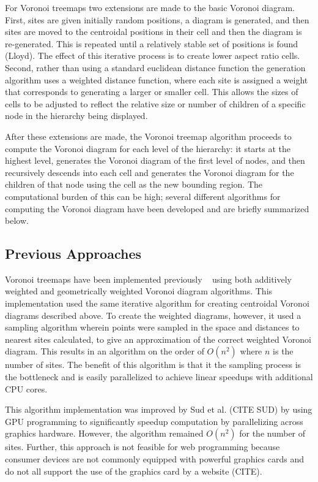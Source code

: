 \documentclass{acm_proc_article-sp}
\begin{document}
For Voronoi treemaps two extensions are made to the basic Voronoi
diagram. First, sites are given initially random positions, a diagram
is generated, and then sites are moved to the centroidal positions in
their cell and then the diagram is re-generated. This is repeated
until a relatively stable set of positions is found (Lloyd). The effect of
this iterative process is to create lower aspect ratio cells. Second,
rather than using a standard euclidean distance function the
generation algorithm uses a weighted distance function, where each
site is assigned a weight that corresponds to generating a larger or
smaller cell. This allows the sizes of cells to be adjusted to reflect
the relative size or number of children of a specific node in the
hierarchy being displayed. 

After these extensions are made, the Voronoi treemap algorithm
proceeds to compute the Voronoi diagram for each level of the
hierarchy: it starts at the highest level, generates the Voronoi
diagram of the first level of nodes, and then recursively descends
into each cell and generates the Voronoi diagram for the children of
that node using the cell as the new bounding region. The computational
burden of this can be high; several different algorithms for computing
the Voronoi diagram have been developed and are briefly summarized
below.

\subsection{Previous Approaches}
Voronoi treemaps have been implemented previously ~\cite{balzer:treemaps} using both
additively weighted and geometrically weighted Voronoi diagram
algorithms. This implementation used the same iterative algorithm for
creating centroidal Voronoi diagrams described above. To create the
weighted diagrams, however, it used a sampling algorithm wherein
points were sampled in the space and distances to nearest sites
calculated, to give an approximation of the correct weighted Voronoi
diagram. This results in an algorithm on the order of $O(n^2)$ where
$n$ is the number of sites. The benefit of this algorithm is that it
the sampling process is the bottleneck and is easily parallelized to
achieve linear speedups with additional CPU cores.

This algorithm implementation was improved by Sud et al. (CITE SUD) by
using GPU programming to significantly speedup computation by
parallelizing across graphics hardware. However, the algorithm
remained $O(n^2)$ for the number of sites. Further, this approach is
not feasible for web programming because consumer devices are not
commonly equipped with powerful graphics cards and do not all support
the use of the graphics card by a website (CITE).
\end{document}
